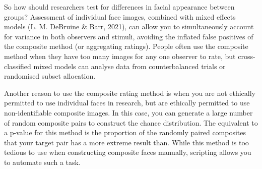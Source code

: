 \documentclass[
  doc,floatsintext]{apa6}
\begin{document}
So how should researchers test for differences in facial appearance between groups? Assessment of individual face images, combined with mixed effects models (L. M. DeBruine \& Barr, 2021), can allow you to simultaneously account for variance in both observers and stimuli, avoiding the inflated false positives of the composite method (or aggregating ratings). People often use the composite method when they have too many images for any one observer to rate, but cross-classified mixed models can analyse data from counterbalanced trials or randomised subset allocation.

Another reason to use the composite rating method is when you are not ethically permitted to use individual faces in research, but are ethically permitted to use non-identifiable composite images. In this case, you can generate a large number of random composite pairs to construct the chance distribution. The equivalent to a p-value for this method is the proportion of the randomly paired composites that your target pair has a more extreme result than. While this method is too tedious to use when constructing composite faces manually, scripting allows you to automate such a task.
\end{document}
